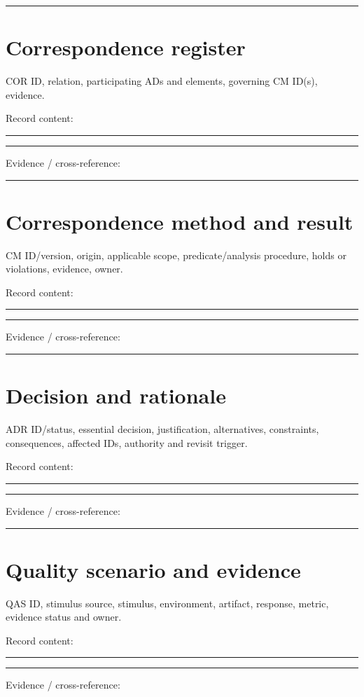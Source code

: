 \documentclass[11pt,letterpaper]{article}
\newcommand{\docsection}[1]{\Needspace{5\baselineskip}\section{#1}}
\begin{document}
\noindent\rule{\linewidth}{0.35pt}\par
\docsection{Correspondence register}
COR ID, relation, participating ADs and elements, governing CM ID(s), evidence.

Record content:

\noindent\rule{\linewidth}{0.35pt}\par\vspace{0.7em}
\noindent\rule{\linewidth}{0.35pt}\par\vspace{0.7em}
Evidence / cross-reference:

\noindent\rule{\linewidth}{0.35pt}\par
\docsection{Correspondence method and result}
CM ID/version, origin, applicable scope, predicate/analysis procedure, holds or violations, evidence, owner.

Record content:

\noindent\rule{\linewidth}{0.35pt}\par\vspace{0.7em}
\noindent\rule{\linewidth}{0.35pt}\par\vspace{0.7em}
Evidence / cross-reference:

\noindent\rule{\linewidth}{0.35pt}\par
\docsection{Decision and rationale}
ADR ID/status, essential decision, justification, alternatives, constraints, consequences, affected IDs, authority and revisit trigger.

Record content:

\noindent\rule{\linewidth}{0.35pt}\par\vspace{0.7em}
\noindent\rule{\linewidth}{0.35pt}\par\vspace{0.7em}
Evidence / cross-reference:

\noindent\rule{\linewidth}{0.35pt}\par
\docsection{Quality scenario and evidence}
QAS ID, stimulus source, stimulus, environment, artifact, response, metric, evidence status and owner.

Record content:

\noindent\rule{\linewidth}{0.35pt}\par\vspace{0.7em}
\noindent\rule{\linewidth}{0.35pt}\par\vspace{0.7em}
Evidence / cross-reference:
\end{document}
